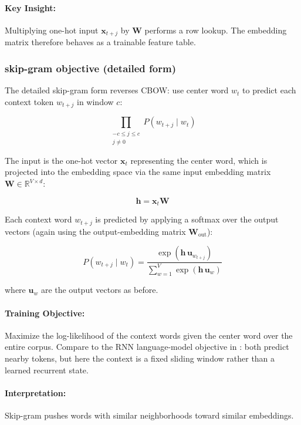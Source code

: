 \paragraph{Key Insight:} Multiplying one-hot input \( \mathbf{x}_{t+j} \) by \(\mathbf{W}\) performs a row lookup. The embedding matrix therefore behaves as a trainable feature table.

\subsubsection{skip-gram objective (detailed form)}
\label{sec:nlp_skip_gram_model_sub}

The detailed skip-gram form reverses CBOW: use center word \(w_t\) to predict each context token \(w_{t+j}\) in window \(c\):

\[
\prod_{\substack{-c \leq j \leq c \\ j \neq 0}} P(w_{t+j} \mid w_t)
\]

The input is the one-hot vector \( \mathbf{x}_t \) representing the center word, which is projected into the embedding space via the same input embedding matrix \( \mathbf{W} \in \mathbb{R}^{V \times d} \):

\[
\mathbf{h} = \mathbf{x}_t\mathbf{W}
\]

Each context word \( w_{t+j} \) is predicted by applying a softmax over the output vectors (again using the output-embedding matrix \(\mathbf{W}_{\text{out}}\)):

\begin{equation}
P(w_{t+j} \mid w_t) = \frac{\exp(\mathbf{h}\,\mathbf{u}_{w_{t+j}})}{\sum_{w=1}^V \exp(\mathbf{h}\,\mathbf{u}_w)}
\label{eq:skipgram-softmax}
\end{equation}

where \( \mathbf{u}_w \) are the output vectors as before.

\paragraph{Training Objective:} Maximize the log-likelihood of the context words given the center word over the entire corpus. Compare to the RNN language-model objective in : both predict nearby tokens, but here the context is a fixed sliding window rather than a learned recurrent state.

\paragraph{Interpretation:} Skip-gram pushes words with similar neighborhoods toward similar embeddings.

